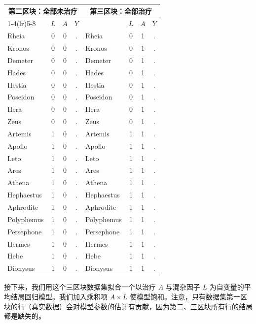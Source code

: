\begin{center}
\small
\begin{tabular}{lccc@{\hspace{2.6em}}lccc}
\toprule
\multicolumn{4}{c}{第二区块：全部未治疗} & \multicolumn{4}{c}{第三区块：全部治疗}\\
\cmidrule(lr){1-4}\cmidrule(lr){5-8}
 & $L$ & $A$ & $Y$ & & $L$ & $A$ & $Y$\\
\midrule
Rheia      & 0 & 0 & . & Rheia      & 0 & 1 & .\\
Kronos     & 0 & 0 & . & Kronos     & 0 & 1 & .\\
Demeter    & 0 & 0 & . & Demeter    & 0 & 1 & .\\
Hades      & 0 & 0 & . & Hades      & 0 & 1 & .\\
Hestia     & 0 & 0 & . & Hestia     & 0 & 1 & .\\
Poseidon   & 0 & 0 & . & Poseidon   & 0 & 1 & .\\
Hera       & 0 & 0 & . & Hera       & 0 & 1 & .\\
Zeus       & 0 & 0 & . & Zeus       & 0 & 1 & .\\
Artemis    & 1 & 0 & . & Artemis    & 1 & 1 & .\\
Apollo     & 1 & 0 & . & Apollo     & 1 & 1 & .\\
Leto       & 1 & 0 & . & Leto       & 1 & 1 & .\\
Ares       & 1 & 0 & . & Ares       & 1 & 1 & .\\
Athena     & 1 & 0 & . & Athena     & 1 & 1 & .\\
Hephaestus & 1 & 0 & . & Hephaestus & 1 & 1 & .\\
Aphrodite  & 1 & 0 & . & Aphrodite  & 1 & 1 & .\\
Polyphemus & 1 & 0 & . & Polyphemus & 1 & 1 & .\\
Persephone & 1 & 0 & . & Persephone & 1 & 1 & .\\
Hermes     & 1 & 0 & . & Hermes     & 1 & 1 & .\\
Hebe       & 1 & 0 & . & Hebe       & 1 & 1 & .\\
Dionysus   & 1 & 0 & . & Dionysus   & 1 & 1 & .\\
\bottomrule
\end{tabular}
\end{center}

接下来，我们用这个三区块数据集拟合一个以治疗 $A$ 与混杂因子 $L$ 为自变量的平均结局回归模型。我们加入乘积项 $A\times L$ 使模型饱和。注意，只有数据集第一区块的行（真实数据）会对模型参数的估计有贡献，因为第二、三区块所有行的结局都是缺失的。

